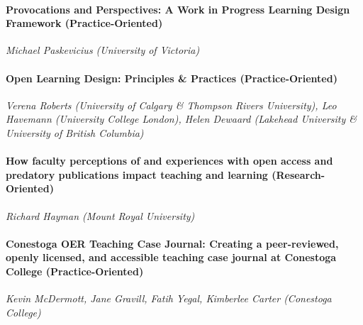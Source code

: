 \documentclass[
]{book}
\begin{document}
\begin{secondary}
\hypertarget{provocations-and-perspectives-a-work-in-progress-learning-design-framework-practice-oriented}{%
\paragraph{Provocations and Perspectives: A Work in Progress Learning
Design Framework
(Practice-Oriented)}\label{provocations-and-perspectives-a-work-in-progress-learning-design-framework-practice-oriented}}

\emph{Michael Paskevicius (University of Victoria)}
\end{secondary}

\begin{secondary}
\hypertarget{open-learning-design-principles-practices-practice-oriented}{%
\paragraph{Open Learning Design: Principles \& Practices
(Practice-Oriented)}\label{open-learning-design-principles-practices-practice-oriented}}

\emph{Verena Roberts (University of Calgary \& Thompson Rivers
University), Leo Havemann (University College London), Helen Dewaard
(Lakehead University \& University of British Columbia)}
\end{secondary}

\begin{secondary}
\hypertarget{how-faculty-perceptions-of-and-experiences-with-open-access-and-predatory-publications-impact-teaching-and-learning-research-oriented}{%
\paragraph{How faculty perceptions of and experiences with open access
and predatory publications impact teaching and learning
(Research-Oriented)}\label{how-faculty-perceptions-of-and-experiences-with-open-access-and-predatory-publications-impact-teaching-and-learning-research-oriented}}

\emph{Richard Hayman (Mount Royal University)}
\end{secondary}

\begin{secondary}
\hypertarget{conestoga-oer-teaching-case-journal-creating-a-peer-reviewed-openly-licensed-and-accessible-teaching-case-journal-at-conestoga-college-practice-oriented}{%
\paragraph{Conestoga OER Teaching Case Journal: Creating a
peer-reviewed, openly licensed, and accessible teaching case journal at
Conestoga College
(Practice-Oriented)}\label{conestoga-oer-teaching-case-journal-creating-a-peer-reviewed-openly-licensed-and-accessible-teaching-case-journal-at-conestoga-college-practice-oriented}}

\emph{Kevin McDermott, Jane Gravill, Fatih Yegal, Kimberlee Carter
(Conestoga College)}
\end{secondary}
\end{document}
